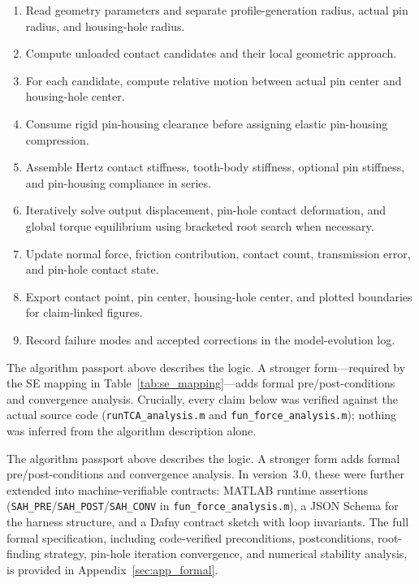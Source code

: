 \documentclass{article}
\newcommand{\revmark}{\marginpar{\footnotesize\textcolor{blue}{\textbf{Rev.\,2}}}}
\newcommand{\revmarkthree}{\marginpar{\footnotesize\textcolor{red}{\textbf{Rev.\,3}}}}
\begin{document}
\begin{tcolorbox}[colback=gray!3!white,colframe=gray!65!black,title=Pseudocode Evidence: Harnessed LTCA Solver,arc=4mm,boxrule=1pt]
\small
\begin{enumerate}
    \item Read geometry parameters and separate profile-generation radius, actual pin radius, and housing-hole radius.
    \item Compute unloaded contact candidates and their local geometric approach.
    \item For each candidate, compute relative motion between actual pin center and housing-hole center.
    \item Consume rigid pin-housing clearance before assigning elastic pin-housing compression.
    \item Assemble Hertz contact stiffness, tooth-body stiffness, optional pin stiffness, and pin-housing compliance in series.
    \item Iteratively solve output displacement, pin-hole contact deformation, and global torque equilibrium using bracketed root search when necessary.
    \item Update normal force, friction contribution, contact count, transmission error, and pin-hole contact state.
    \item Export contact point, pin center, housing-hole center, and plotted boundaries for claim-linked figures.
    \item Record failure modes and accepted corrections in the model-evolution log.
\end{enumerate}
\end{tcolorbox}

The algorithm passport above describes the logic. A stronger form---required by the SE mapping in Table~\ref{tab:se_mapping}---adds formal pre/post-conditions and convergence analysis. Crucially, every claim below was verified against the actual source code (\texttt{runTCA\_analysis.m} and \texttt{fun\_force\_analysis.m}); nothing was inferred from the algorithm description alone.

\revmark %
\revmarkthree %
The algorithm passport above describes the logic. A stronger form adds formal pre/post-conditions and convergence analysis. In version~3.0, these were further extended into machine-verifiable contracts: MATLAB runtime assertions (\texttt{SAH\_PRE}/\texttt{SAH\_POST}/\texttt{SAH\_CONV} in \texttt{fun\_force\_analysis.m}), a JSON Schema for the harness structure, and a Dafny contract sketch with loop invariants. The full formal specification, including code-verified preconditions, postconditions, root-finding strategy, pin-hole iteration convergence, and numerical stability analysis, is provided in Appendix~\ref{sec:app_formal}.
\end{document}

